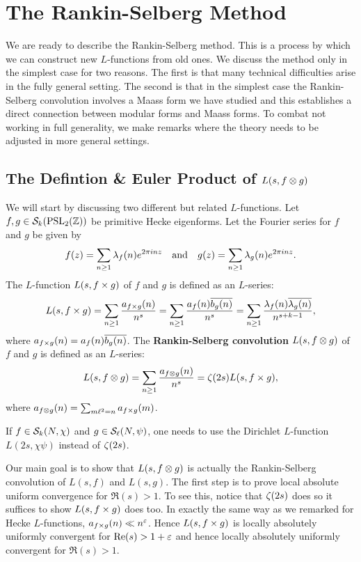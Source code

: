   \section{The Rankin-Selberg Method}\label{sec:The_Rankin-Selberg_Method}
    We are ready to describe the Rankin-Selberg method. This is a process by which we can construct new $L$-functions from old ones. We discuss the method only in the simplest case for two reasons. The first is that many technical difficulties arise in the fully general setting. The second is that in the simplest case the Rankin-Selberg convolution involves a Maass form we have studied and this establishes a direct connection between modular forms and Maass forms. To combat not working in full generality, we make remarks where the theory needs to be adjusted in more general settings.
    \subsection*{The Defintion \& Euler Product of \texorpdfstring{$L(s,f \otimes g)$}{L(s,f \ox g)}}
      We will start by discussing two different but related $L$-functions. Let $f,g \in \mathcal{S}_{k}(\mathrm{PSL}_{2}(\mathbb{Z}))$ be primitive Hecke eigenforms. Let the Fourier series for $f$ and $g$ be given by
      \[
        f(z) = \sum_{n \ge 1}\lambda_{f}(n)e^{2\pi inz} \quad \text{and} \quad g(z) = \sum_{n \ge 1}\lambda_{g}(n)e^{2\pi inz}.
      \]
      The $L$-function $L(s,f \times g)$ of $f$ and $g$ is defined as an $L$-series:
      \[
        L(s,f \times g) = \sum_{n \ge 1}\frac{a_{f \times g}(n)}{n^{s}} = \sum_{n \ge 1}\frac{a_{f}(n)\overline{b_{g}(n)}}{n^{s}} = \sum_{n \ge 1}\frac{\lambda_{f}(n)\overline{\lambda_{g}(n)}}{n^{s+k-1}},
      \]
      where $a_{f \times g}(n) = a_{f}(n)\overline{b_{g}(n)}$. The \textbf{Rankin-Selberg convolution} $L(s,f \otimes g)$ of $f$ and $g$ is defined as an $L$-series:
      \[
        L(s,f \otimes g) = \sum_{n \ge 1}\frac{a_{f \otimes g}(n)}{n^{s}} = \zeta(2s)L(s,f \times g),
      \]
      where $a_{f \otimes g}(n) = \sum_{m\ell^{2} = n}a_{f \times g}(m)$.

      \begin{remark}
        If $f \in \mathcal{S}_{k}(N,\chi)$ and $g \in \mathcal{S}_{\ell}(N,\psi)$, one needs to use the Dirichlet $L$-function $L(2s,\chi\psi)$ instead of $\zeta(2s)$.
      \end{remark}

      Our main goal is to show that $L(s,f \otimes g)$ is actually the Rankin-Selberg convolution of $L(s,f)$ and $L(s,g)$. The first step is to prove local absolute uniform convergence for $\Re(s) > 1$. To see this, notice that $\zeta(2s)$ does so it suffices to show $L(s,f \times g)$ does too. In exactly the same way as we remarked for Hecke $L$-functions, $a_{f \times g}(n) \ll n^{\varepsilon}$. Hence $L(s,f \times g)$ is locally absolutely uniformly convergent for $\mathrm{Re}(s) > 1+\varepsilon$ and hence locally absolutely uniformly convergent for $\Re(s) > 1$.
      
